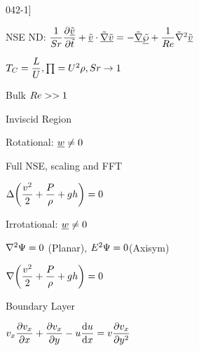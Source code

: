 \begin{mitframe}{042-1}]

        
\begin{listone}

\item NSE ND: $\dfrac{1}{\strouhal}\dfrac{\partial\uline{\tilde{\vvel}}}{\partial\tilde{t}}+\uline{\tilde{\vvel}}\cdot\uline{\tilde{\nabla}\tilde{\vvel}}=-\tilde{\gradop}\uline{\tilde{\dynpress}}+\dfrac{1}{\reynolds}\tilde{\nabla}^2\uline{\tilde{\vvel}}$
\item $\Temp_{\conc}=\dfrac{\length}{\uvel}, \prod=\uvel^2\dens, \strouhal\rightarrow{1}$
			\begin{listtwo}
            \item Bulk $\reynolds>> 1$
            \end{listtwo}
\item Inviscid Region
			\begin{listtwo}
            \item Rotational: $\vort\neq{0}$
            				\begin{listthree}
                            \item Full NSE, scaling and FFT	                          					  \item $\iipf\bigg(\dfrac{\vvel^2}{2}+\dfrac{\p}{\dens}+\grav\heattranscoeff\bigg)=0$
                            \end{listthree}
            \item Irrotational: $\vort\neq{0}$
            				\begin{listthree}
                            \item $\nabla^2\streamfunc=0$ (Planar), $\energy^2\streamfunc=0$(Axisym)
                            
                            			\begin{listfour}
                                        \item $\nabla\bigg(\dfrac{\vvel^2}{2}+\dfrac{\p}{\dens}+\grav\heattranscoeff\bigg)=0$
                                        \end{listfour}
\item Boundary Layer
			\begin{listtwo}
            \item $\vvel_{\disp}\dfrac{\partial\vvel_{\disp}}{\partial\disp}+\dfrac{\partial\vvel_{\disp}}{\partial{y}}-\forcepot\dfrac{\mathrm{d}\forcepot}{\mathrm{d}\disp}=\vvel\dfrac{\partial\vvel_{\disp}}{\partial{y}^2}$
            

\end{listtwo}
\end{listthree}
\end{listtwo}
\end{listone}
\end{mitframe}
